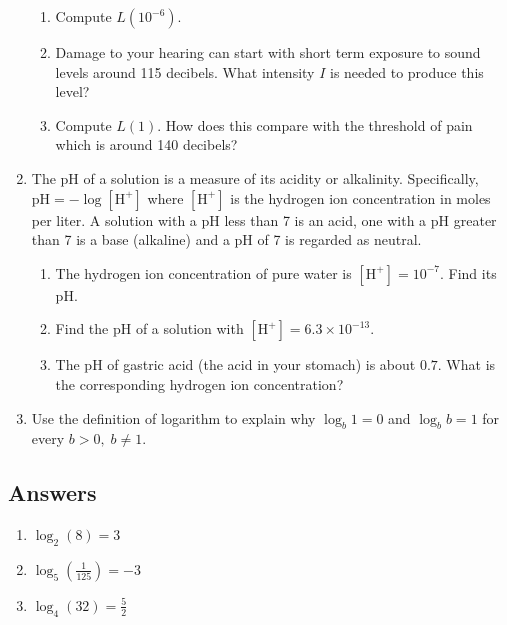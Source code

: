 \documentclass{ximera}
\begin{document}
\begin{enumerate}
\begin{enumerate}

\item Compute $L(10^{-6})$.
\item Damage to your hearing can start with short term exposure to sound levels around 115 decibels.  What intensity $I$ is needed to produce this level? 
\item Compute $L(1)$.  How does this compare with the threshold of pain which is around 140 decibels?

\end{enumerate}

\item \label{pHexercise}    The pH of a solution is a measure of its acidity or alkalinity.  Specifically, $\mbox{pH} = -\log[\mbox{H}^{+}]$ where $[\mbox{H}^{+}]$ is the hydrogen ion concentration in moles per liter.  A solution with a pH less than 7 is an acid, one with a pH greater than 7 is a base (alkaline) and a pH of 7 is regarded as neutral.

\begin{enumerate}

\item The hydrogen ion concentration of pure water is $[\mbox{H}^{+}] = 10^{-7}$.  Find its pH.
\item Find the pH of a solution with $[\mbox{H}^{+}] = 6.3 \times 10^{-13}$.
\item The pH of gastric acid (the acid in your stomach) is about $0.7$.  What is the corresponding hydrogen ion concentration?

\end{enumerate}

\item Use the definition of logarithm to explain why  $\log_{b} 1 = 0$ and $\log_{b} b = 1$ for every $b > 0, \; b \neq 1$.


\setcounter{HW}{\value{enumi}}
\end{enumerate}


\newpage

\subsection{Answers}

\begin{multicols}{3}
\begin{enumerate}

\item $\log_{2}(8) = 3$

\item  $\log_{5}\left(\frac{1}{125}\right) = -3$

\item  $\log_{4}(32) = \frac{5}{2}$

\setcounter{HW}{\value{enumi}}
\end{enumerate}
\end{multicols}
\end{document}
